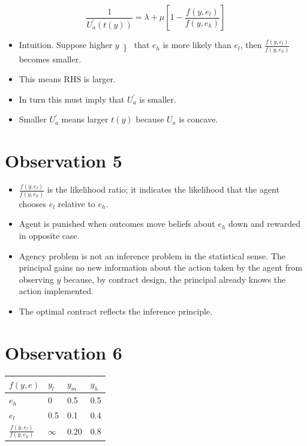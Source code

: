 \documentclass[10pt]{article}
\begin{document}
$$
\frac{1}{U_{a}^{\prime}(t(y))}=\lambda+\mu\left[1-\frac{f\left(y, e_{l}\right)}{f\left(y, e_{h}\right)}\right]
$$

\begin{itemize}
  \item Intuition. Suppose higher $y\left\}\right.$ that $e_{h}$ is more likely than $e_{l}$, then $\frac{f\left(y, e_{l}\right)}{f\left(y, e_{h}\right)}$ becomes smaller.
  \item This means RHS is larger.
  \item In turn this must imply that $U_{a}^{\prime}$ is smaller.
  \item Smaller $U_{a}^{\prime}$ means larger $t(y)$ because $U_{a}$ is concave.
\end{itemize}

\section*{Observation 5}
\begin{itemize}
  \item $\frac{f\left(y, e_{l}\right)}{f\left(y, e_{h}\right)}$ is the likelihood ratio; it indicates the likelihood that the agent chooses $e_{l}$ relative to $e_{h}$.
  \item Agent is punished when outcomes move beliefs about $e_{h}$ down and rewarded in opposite case.
  \item Agency problem is not an inference problem in the statistical sense. The principal gains no new information about the action taken by the agent from observing $y$ because, by contract design, the principal already knows the action implemented.
  \item The optimal contract reflects the inference principle.
\end{itemize}

\section*{Observation 6}
\begin{center}
\begin{tabular}{llll}
$f(y, e)$ & $y_{l}$ & $y_{m}$ & $y_{h}$ \\
\hline
$e_{h}$ & 0 & 0.5 & 0.5 \\
\hline
$e_{l}$ & 0.5 & 0.1 & 0.4 \\
\hline
$\frac{f\left(y, e_{l}\right)}{f\left(y, e_{h}\right)}$ & $\infty$ & 0.20 & 0.8 \\
\hline
\end{tabular}
\end{center}
\end{document}
